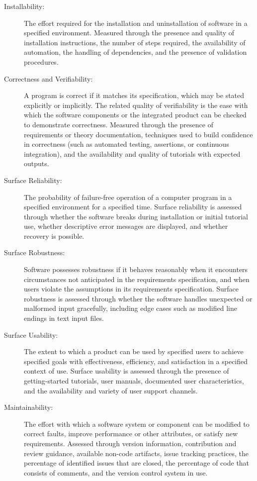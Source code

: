 \begin{description}
    \item[Installability:] The effort required for the installation and uninstallation of software in a specified environment. Measured through the presence and quality of installation instructions, the number of steps required, the availability of automation, the handling of dependencies, and the presence of validation procedures.
    \item[Correctness and Verifiability:] A program is correct if it matches its specification, which may be stated explicitly or implicitly. The related quality of verifiability is the ease with which the software components or the integrated product can be checked to demonstrate correctness. Measured through the presence of requirements or theory documentation, techniques used to build confidence in correctness (such as automated testing, assertions, or continuous integration), and the availability and quality of tutorials with expected outputs.
    \item[Surface Reliability:] The probability of failure-free operation of a computer program in a specified environment for a specified time. Surface reliability is assessed through whether the software breaks during installation or initial tutorial use, whether descriptive error messages are displayed, and whether recovery is possible.
    \item[Surface Robustness:] Software possesses robustness if it behaves reasonably when it encounters circumstances not anticipated in the requirements specification, and when users violate the assumptions in its requirements specification. Surface robustness is assessed through whether the software handles unexpected or malformed input gracefully, including edge cases such as modified line endings in text input files.
    \item[Surface Usability:] The extent to which a product can be used by specified users to achieve specified goals with effectiveness, efficiency, and satisfaction in a specified context of use. Surface usability is assessed through the presence of getting-started tutorials, user manuals, documented user characteristics, and the availability and variety of user support channels.
    \item[Maintainability:] The effort with which a software system or component can be modified to correct faults, improve performance or other attributes, or satisfy new requirements. Assessed through version information, contribution and review guidance, available non-code artifacts, issue tracking practices, the percentage of identified issues that are closed, the percentage of code that consists of comments, and the version control system in use.

\end{description}
